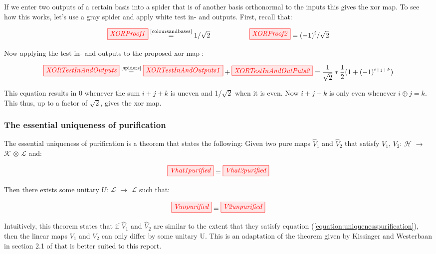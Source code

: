 \documentclass[]{article}
\newcommand{\equaltext}[1]{\ensuremath{\stackrel{\text{#1}}{=}}}
\begin{document}
If we enter two outputs of a certain basis into a spider that is of another basis orthonormal to the inputs this gives the xor map. To see how this works, let's use a gray spider and apply white test in- and outputs. First, recall that:

\begin{equation}
	\tikzfig{XORProof1} \equaltext{\ref{coloursandbases}} 1/\sqrt{2} ~~~~~~~~~~~~~~~~~ \tikzfig{XORProof2} = (-1)^i/\sqrt{2}
\end{equation}

Now applying the test in- and outputs to the proposed xor map \cite{Coecke2017}:

\begin{equation}
	\label{equation:xormap}
	\tikzfig{XORTestInAndOutputs} \equaltext{\ref{spiders}} \tikzfig{XORTestInAndOutputs1} + \tikzfig{XORTestInAndOutPuts2} = \frac{1}{\sqrt{2}} * \frac{1}{2}(1+(-1)^{i+j+k})
\end{equation}

This equation results in 0 whenever the sum $i+j+k$ is uneven and 1/$\sqrt{2}$ when it is even. Now $i+j+k$ is only even whenever $i \oplus j = k$. This thus, up to a factor of $\sqrt{2}$, gives the xor map.

\subsubsection{The essential uniqueness of purification}
\label{section:essentialuniqueness}

The essential uniqueness of purification is a theorem that states the following: Given two pure maps $\hat{V}_1$ and $\hat{V}_2$ that satisfy $V_1$, $V_2$: $\mathcal{H}$ $\rightarrow$ $\mathcal{K}$ $\otimes$ $\mathcal{L}$ and:

\begin{equation}
	\label{equation:uniquenesspurification}
	\tikzfig{Vhat1purified} = \tikzfig{Vhat2purified}
\end{equation}

Then there exists some unitary $U$: $\mathcal{L}$ $\rightarrow$ $\mathcal{L}$ such that:

\begin{equation}
	\tikzfig{Vunpurified} = \tikzfig{V2unpurified}
\end{equation}

Intuitively, this theorem states that if $\hat{V}_1$ and $\hat{V}_2$ are similar to the extent that they satisfy equation (\ref{equation:uniquenesspurification}), then the linear maps $V_1$ and $V_2$ can only differ by some unitary U. This is an adaptation of the theorem given by Kissinger and Westerbaan in section 2.1 of \cite{Kissinger2017} that is better suited to this report.
\end{document}
